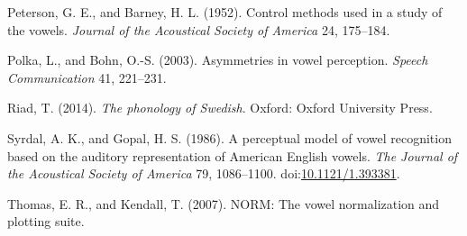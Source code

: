 \documentclass[utf8]{frontiers_suppmat} %
\newlength{\cslhangindent}
\newlength{\cslentryspacingunit} %
\newenvironment{CSLReferences}[2] %
 {%
  \setlength{\parindent}{0pt}
  \ifodd #1
  \let\oldpar\par
  \def\par{\hangindent=\cslhangindent\oldpar}
  \fi
  \setlength{\parskip}{#2\cslentryspacingunit}
 }%
 {}
\begin{document}
\begin{CSLReferences}{1}{0}
\leavevmode{}%
Peterson, G. E., and Barney, H. L. (1952). Control methods used in a study of the vowels. \emph{Journal of the Acoustical Society of America} 24, 175--184.

\leavevmode{}%
Polka, L., and Bohn, O.-S. (2003). Asymmetries in vowel perception. \emph{Speech Communication} 41, 221--231.

\leavevmode{}%
Riad, T. (2014). \emph{The phonology of {Swedish}}. {Oxford}: {Oxford University Press}.

\leavevmode{}%
Syrdal, A. K., and Gopal, H. S. (1986). A perceptual model of vowel recognition based on the auditory representation of {American English} vowels. \emph{The Journal of the Acoustical Society of America} 79, 1086--1100. doi:\href{https://doi.org/10.1121/1.393381}{10.1121/1.393381}.

\leavevmode{}%
Thomas, E. R., and Kendall, T. (2007). {NORM}: {The} vowel normalization and plotting suite.

\end{CSLReferences}

\endgroup
\end{document}
